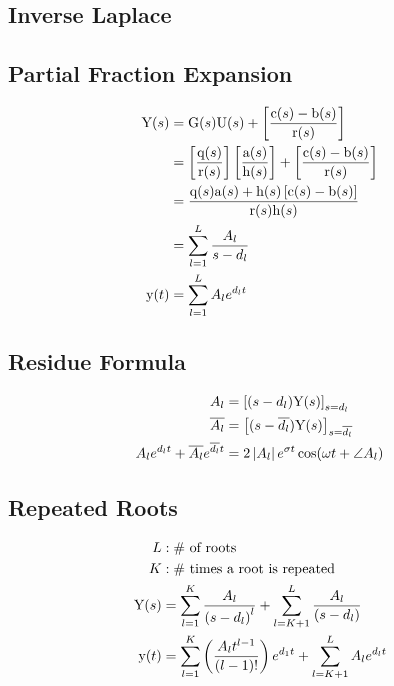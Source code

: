 \documentclass[8pt]{extarticle}
\begin{document}
\begin{multicols*}{3}
\section*{Inverse Laplace}
\subsection*{Partial Fraction Expansion}
\begin{align*}
    \func{Y}[s] &= \func{G}[s]\func{U}[s]+\left[\frac{\func{c}[s]-\func{b}[s]}{\func{r}[s]}\right] \\
                &= \left[\frac{\func{q}[s]}{\func{r}[s]}\right]\left[\frac{\func{a}[s]}{\func{h}[s]}\right]+\left[\frac{\func{c}[s]-\func{b}[s]}{\func{r}[s]}\right] \\
                &= \frac{\func{q}[s]\func{a}[s]+\func{h}[s]\left[\func{c}[s]-\func{b}[s]\right]}{\func{r}[s]\func{h}[s]} \\
                &= \sum_{l=1}^{L}\frac{A_l}{s-d_l} \\
    \func{y}[t] &= \sum_{l=1}^{L}A_l e^{d_l t}
\end{align*}

\subsection*{Residue Formula}
\begin{align*}
    A_l &= {\left[(s-d_l)\func{Y}[s]\right]}_{s=d_l} \\
    \overline{A_l} &= {\left[(s-\overline{d_l})\func{Y}[s]\right]}_{s=\overline{d_l}} \\
    A_l e^{d_l t} + \overline{A_l} e^{\overline{d_l} t} &= 2 \left|A_l\right| e^{\sigma t} \cos{\omega t + \angle A_l}
\end{align*}

\subsection*{Repeated Roots}
\begin{align*}
    L &: \text{\# of roots} \\
    K &: \text{\# times a root is repeated} \\
    \func{Y}[s] &= \sum_{l=1}^{K} \frac{A_l}{{(s-d_l)}^l}+\sum_{l=K+1}^{L}\frac{A_l}{(s-d_l)} \\
    \func{y}[t] &= \sum_{l=1}^{K}\left(\frac{A_l t^{l-1}}{(l-1)!}\right)e^{d_1 t} + \sum_{l=K+1}^{L}A_l e^{d_l t}
\end{align*}


\end{multicols*}
\end{document}
